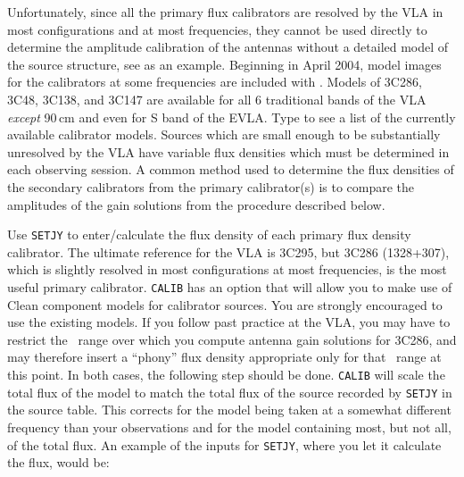       Unfortunately, since all the primary flux calibrators are
resolved by the VLA in most configurations and at most frequencies,
they cannot be used directly to determine the amplitude calibration of
the antennas without a detailed model of the source structure, see
 as an example.  Beginning in April 2004, model images
for the calibrators at some frequencies are included with \AIPS\@.
Models of 3C286, 3C48, 3C138, and 3C147 are available for all 6
traditional bands of the VLA {\it except} 90\,cm and even for S band
of the EVLA.  Type {\us {} \CR} to see a list of the
currently available calibrator models.  Sources which are small enough
to be substantially unresolved by the VLA have variable flux densities
which must be determined in each observing session.  A common method
used to determine the flux densities of the secondary calibrators from
the primary calibrator(s) is to compare the amplitudes of the gain
solutions from the procedure described below.

    Use {\tt SETJY} to enter/calculate the flux density of each
primary flux density calibrator.  The ultimate reference for the VLA
is 3C295, but 3C286 (1328+307), which is slightly resolved in most
configurations at most frequencies, is the most useful primary
calibrator.  {\tt CALIB} has an option that will allow you to make use
of Clean component models for calibrator sources.  You are strongly
encouraged to use the existing models.  If you follow past practice
at the VLA, you may have to restrict the \uv\ range over which you
compute antenna gain solutions for 3C286, and may therefore insert a
``phony'' flux density appropriate only for that \uv\ range at this
point.  In both cases, the following step should be done.  {\tt CALIB}
will scale the total flux of the model to match the total flux of the
source recorded by {\tt SETJY} in the source table.  This corrects for
the model being taken at a somewhat different frequency than your
observations and for the model containing most, but not all, of the
total flux.  An example of the inputs for {\tt SETJY}, where you let
it calculate the flux, would be:


